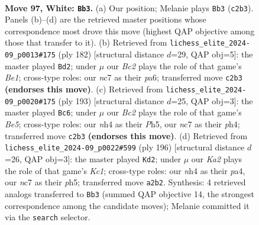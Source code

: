 \documentclass[11pt]{article}
\begin{document}
\clearpage

\begin{figure}[p]\centering
\begin{subfigure}{0.46\textwidth}\centering
\resizebox{\linewidth}{!}{%
\newchessgame
\chessboard[
  setfen={8/1Nn3k1/8/8/Pp2P2n/4p3/K1Bb3p/8 w - - 2 97},
  showmover=false,
  pgfstyle=straightmove, color=movearrow, markmove={c2-b3}
]}
\caption{}
\end{subfigure}\hfill
\begin{subfigure}{0.46\textwidth}\centering
\resizebox{\linewidth}{!}{%
\newchessgame
\chessboard[
  setfen={8/8/p7/P1k4p/6bP/4Kp2/8/4B3 w - - 82 92},
  showmover=false,
  pgfstyle=straightmove, color=movearrow, markmove={e1-d2}
]}
\caption{}
\end{subfigure}
\\[4pt]
\begin{subfigure}{0.46\textwidth}\centering
\resizebox{\linewidth}{!}{%
\newchessgame
\chessboard[
  setfen={8/3k4/PK4p1/7p/2P1b2P/5p2/5P2/4B3 b - - 64 97},
  showmover=false,
  pgfstyle=straightmove, color=movearrow, markmove={e4-c6}
]}
\caption{}
\end{subfigure}\hfill
\begin{subfigure}{0.46\textwidth}\centering
\resizebox{\linewidth}{!}{%
\newchessgame
\chessboard[
  setfen={8/4B3/b7/3k3p/p6P/P2p4/8/2K5 w - - 28 99},
  showmover=false,
  pgfstyle=straightmove, color=movearrow, markmove={c1-d2}
]}
\caption{}
\end{subfigure}
\caption{\textbf{Move 97, White: \texttt{Bb3}.} (a) Our position; Melanie plays \texttt{Bb3} (\texttt{c2b3}). Panels (b)--(d) are the retrieved master positions whose correspondence most drove this move (highest QAP objective among those that transfer to it). (b) Retrieved from \texttt{lichess\_elite\_2024-09\_p0013\#175} (ply 182) [structural distance $d$=29, QAP obj=5]: the master played \texttt{Bd2}; under $\mu$ our \emph{Bc2} plays the role of that game's \emph{Be1}; cross-type roles: our \emph{n}c7 as their \emph{p}a6; transferred move \texttt{c2b3} \textbf{(endorses this move)}. (c) Retrieved from \texttt{lichess\_elite\_2024-09\_p0020\#175} (ply 193) [structural distance $d$=25, QAP obj=3]: the master played \texttt{Bc6}; under $\mu$ our \emph{Bc2} plays the role of that game's \emph{Be5}; cross-type roles: our \emph{n}h4 as their \emph{P}h5, our \emph{n}c7 as their \emph{p}h4; transferred move \texttt{c2b3} \textbf{(endorses this move)}. (d) Retrieved from \texttt{lichess\_elite\_2024-09\_p0022\#599} (ply 196) [structural distance $d$=26, QAP obj=3]: the master played \texttt{Kd2}; under $\mu$ our \emph{Ka2} plays the role of that game's \emph{Kc1}; cross-type roles: our \emph{n}h4 as their \emph{p}a4, our \emph{n}c7 as their \emph{p}h5; transferred move \texttt{a2b2}. Synthesis: 4 retrieved analogs transferred to \texttt{Bb3} (summed QAP objective 14, the strongest correspondence among the candidate moves); Melanie committed it via the \texttt{search} selector.}
\label{fig:thought-m192}
\end{figure}
\end{document}
